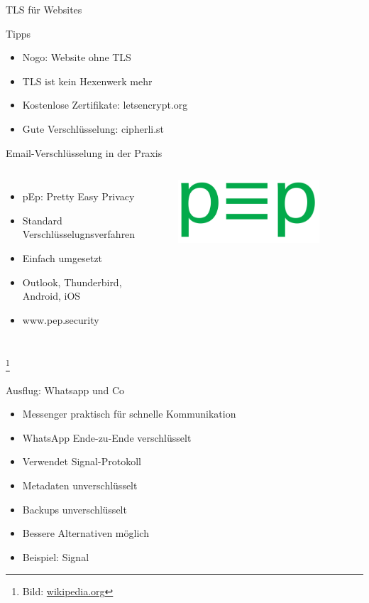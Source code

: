 \documentclass[10pt]{beamer}
\newcommand\blfootnote[1]{%
	\begingroup
	\renewcommand\thefootnote{}\footnote{#1}%
	\addtocounter{footnote}{-1}%
	\endgroup
}
\begin{document}
\begin{frame}[fragile]{TLS für Websites}
\begin{alertblock}{Tipps}
\end{alertblock}
	\begin{itemize}
	\item Nogo: Website ohne TLS
	\item TLS ist kein Hexenwerk mehr
	\item Kostenlose Zertifikate: letsencrypt.org
	\item Gute Verschlüsselung: cipherli.st
\end{itemize}
\end{frame}

%
%
\begin{frame}[fragile]{Email-Verschlüsselung in der Praxis}
\begin{columns}[T,c,onlytextwidth]
	\begin{itemize}
		\item pEp: Pretty Easy Privacy
		\item Standard Verschlüsselugnsverfahren
		\item Einfach umgesetzt
		\item Outlook, Thunderbird, Android, iOS
		\item www.pep.security
	\end{itemize}
	\begin{figure}
		\includegraphics[width=0.9\textwidth]{images/pep}
	\end{figure}
\end{columns}
\blfootnote{Bild: \href{https://de.wikipedia.org/wiki/Pretty_Easy_privacy}{wikipedia.org}}
\end{frame}

%
%
\begin{frame}[fragile]{Ausflug: Whatsapp und Co}
	\begin{itemize}
	\item Messenger praktisch für schnelle Kommunikation
	\item WhatsApp Ende-zu-Ende verschlüsselt
	\item Verwendet Signal-Protokoll
	\item Metadaten unverschlüsselt
	\item Backups unverschlüsselt
	\item Bessere Alternativen möglich
	\item Beispiel: Signal
\end{itemize}
\end{frame}
\end{document}
